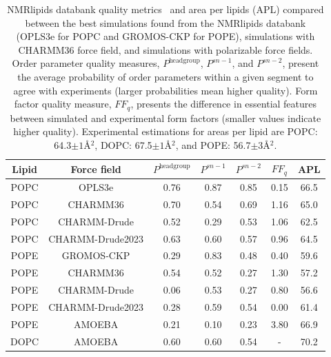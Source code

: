 \documentclass[journal=jacsat,manuscript=article,layout=singlecolumn]{achemso}
\begin{document}
\begin{table}[]
    \centering
    \begin{tabular}{c c c c c c c}
        Lipid & Force field & $P^{\mathrm{headgroup}}$ & $P^{sn-1}$ & $P^{sn-2}$ & $FF_{q}$ & APL \\
        \hline
        POPC & OPLS3e       & 0.76 & 0.87 & 0.85 & 0.15 & 66.5\\
        POPC & CHARMM36     & 0.70 & 0.54 & 0.69 & 1.16 & 65.0\\
        POPC & CHARMM-Drude & 0.52 & 0.29 & 0.53 & 1.06 & 62.5\\
        POPC & CHARMM-Drude2023 & 0.63 & 0.60 & 0.57 & 0.96 & 64.5\\
        \hline
        POPE & GROMOS-CKP & 0.29 & 0.83 & 0.48 & 0.40 & 59.6\\
        POPE & CHARMM36   & 0.54 & 0.52 & 0.27 & 1.30 & 57.2 \\
        POPE & CHARMM-Drude & 0.06 & 0.53 & 0.27 & 0.80 & 56.6  \\
        POPE & CHARMM-Drude2023 & 0.28 & 0.59 & 0.54 & 0.00 & 61.4  \\
        POPE & AMOEBA & 0.21 & 0.10 & 0.23 & 3.80 & 66.9\\
        \hline
        DOPC & AMOEBA & 0.60 & 0.60 & 0.54 & - & 70.2\\
    \end{tabular}
    \caption{NMRlipids databank quality metrics~\cite{Databank} and area per lipids (APL) compared between the best simulations found from the NMRlipids databank (OPLS3e for POPC and GROMOS-CKP for POPE), simulations with CHARMM36 force field, and simulations with polarizable force fields. Order  parameter quality measures, $P^{\mathrm{headgroup}}$, $P^{sn-1}$, and $P^{sn-2}$, present the average probability of order parameters within a given segment to agree with experiments (larger probabilities mean higher quality). Form factor quality measure, $FF_{q}$, presents the difference in essential features between simulated and experimental form factors (smaller values indicate higher quality). Experimental estimations for areas per lipid are POPC: 64.3$\pm1$\AA$^{2}$\cite{kucerka2011}, DOPC: 67.5$\pm1$\AA$^{2}$\cite{kucerka2008}, and POPE: 56.7$\pm$3\AA$^{2}$\cite{Rickeard2020}.}
    \label{tab:my_label}
\end{table}
\end{document}
